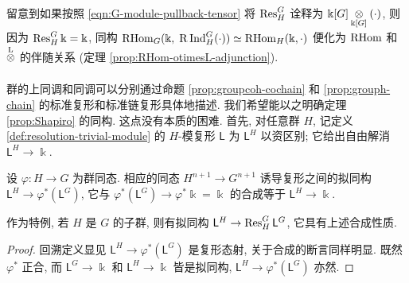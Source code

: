 留意到如果按照 \eqref{eqn:G-module-pullback-tensor} 将 $\operatorname{Res}^G_H$ 诠释为 $\Bbbk[G] \underset{\Bbbk[G]}{\otimes} (\cdot)$, 则因为 $\operatorname{Res}^G_H \Bbbk = \Bbbk$, 同构 $\operatorname{RHom}_G(\Bbbk, \; \mathrm{R}\operatorname{Ind}^G_H(\cdot)) \simeq \operatorname{RHom}_H(\Bbbk, \cdot)$ 便化为 $\operatorname{RHom}$ 和 $\underset{}{\overset{\mathrm{L}}{\otimes}}$ 的伴随关系 (定理 \ref{prop:RHom-otimesL-adjunction}).

群的上同调和同调可以分别通过命题 \ref{prop:groupcoh-cochain} 和 \ref{prop:grouph-chain} 的标准复形和标准链复形具体地描述. 我们希望能以之明确定理 \ref{prop:Shapiro} 的同构. 这点没有本质的困难. 首先, 对任意群 $H$, 记定义 \ref{def:resolution-trivial-module} 的 $H$-模复形 $\mathsf{L}$ 为 $\mathsf{L}^H$ 以资区别; 它给出自由解消 $\mathsf{L}^H \to \Bbbk$.

\begin{lemma}\label{prop:Shapiro-alpha-beta}
	设 $\varphi: H \to G$ 为群同态. 相应的同态 $H^{n+1} \to G^{n+1}$ 诱导复形之间的拟同构 $\mathsf{L}^H \to \varphi^*(\mathsf{L}^G)$, 它与 $\varphi^* (\mathsf{L}^G) \to \varphi^* \Bbbk = \Bbbk$ 的合成等于 $\mathsf{L}^H \to \Bbbk$.
	
	作为特例, 若 $H$ 是 $G$ 的子群, 则有拟同构 $\mathsf{L}^H \to \operatorname{Res}^G_H \mathsf{L}^G$, 它具有上述合成性质.
\end{lemma}
\begin{proof}
	回溯定义显见 $\mathsf{L}^H \to \varphi^*(\mathsf{L}^G)$ 是复形态射, 关于合成的断言同样明显. 既然 $\varphi^*$ 正合, 而 $\mathsf{L}^G \to \Bbbk$ 和 $\mathsf{L}^H \to \Bbbk$ 皆是拟同构, $\mathsf{L}^H \to \varphi^*(\mathsf{L}^G)$ 亦然.
\end{proof}

